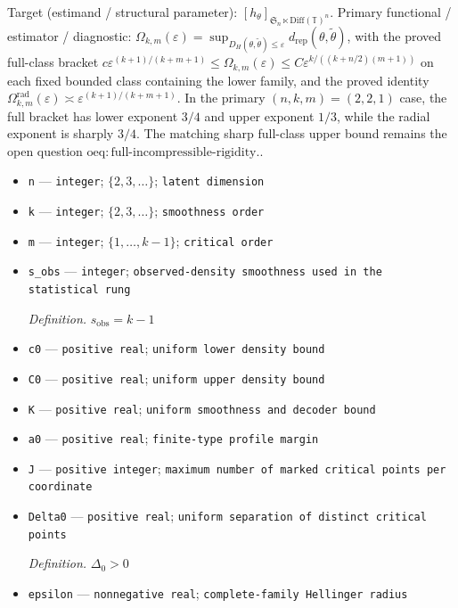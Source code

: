 \documentclass{article}
\begin{document}
Target (estimand / structural parameter): \([h_\theta]_{\mathfrak S_n\ltimes\mathrm{Diff}(\mathbb T)^n}\).
Primary functional / estimator / diagnostic: \(\Omega_{k,m}(\varepsilon)=\sup_{D_H(\theta,\widetilde\theta)\leq\varepsilon}d_{\mathrm{rep}}(\theta,\widetilde\theta)\), with the proved full-class bracket \(c\varepsilon^{(k+1)/(k+m+1)}\leq\Omega_{k,m}(\varepsilon)\leq C\varepsilon^{k/((k+n/2)(m+1))}\) on each fixed bounded class containing the lower family, and the proved identity \(\Omega_{k,m}^{\mathrm{rad}}(\varepsilon)\asymp\varepsilon^{(k+1)/(k+m+1)}\). In the primary \((n,k,m)=(2,2,1)\) case, the full bracket has lower exponent \(3/4\) and upper exponent \(1/3\), while the radial exponent is sharply \(3/4\). The matching sharp full-class upper bound remains the open question \(\mathrm{oeq:full\text{-}incompressible\text{-}rigidity}\)..
\begin{itemize}
  \item \texttt{n} --- \texttt{integer}; \(\{2,3,\ldots\}\); \texttt{latent dimension}
  \item \texttt{k} --- \texttt{integer}; \(\{2,3,\ldots\}\); \texttt{smoothness order}
  \item \texttt{m} --- \texttt{integer}; \(\{1,\ldots,k-1\}\); \texttt{critical order}
  \item \texttt{s\_\allowbreak{}obs} --- \texttt{integer}; \texttt{observed-\allowbreak{}density smoothness used in the statistical rung}
  \par\smallskip\noindent\emph{Definition.} \(s_{\mathrm{obs}}=k-1\)
  \item \texttt{c0} --- \texttt{positive real}; \texttt{uniform lower density bound}
  \item \texttt{C0} --- \texttt{positive real}; \texttt{uniform upper density bound}
  \item \texttt{K} --- \texttt{positive real}; \texttt{uniform smoothness and decoder bound}
  \item \texttt{a0} --- \texttt{positive real}; \texttt{finite-\allowbreak{}type profile margin}
  \item \texttt{J} --- \texttt{positive integer}; \texttt{maximum number of marked critical points per coordinate}
  \item \texttt{Delta0} --- \texttt{positive real}; \texttt{uniform separation of distinct critical points}
  \par\smallskip\noindent\emph{Definition.} \(\Delta_0>0\)
  \item \texttt{epsilon} --- \texttt{nonnegative real}; \texttt{complete-\allowbreak{}family Hellinger radius}

\end{itemize}
\end{document}

